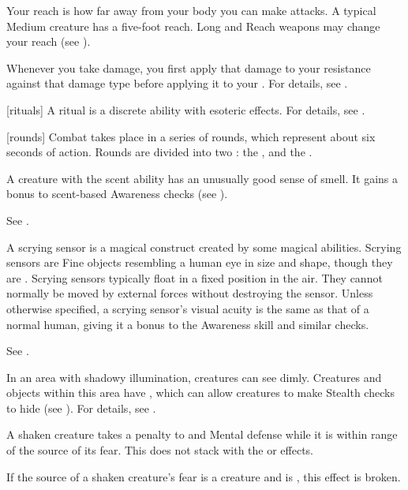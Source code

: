  Your reach is how far away from your body you can make  attacks.
A typical Medium creature has a five-foot reach.
Long and Reach weapons may change your reach (see ).

 Whenever you take damage, you first apply that damage to your resistance against that damage type before applying it to your .
For details, see .

[rituals] A ritual is a discrete  ability with esoteric effects.
For details, see .

[rounds] Combat takes place in a series of rounds, which represent about six seconds of action.
Rounds are divided into two : the , and the .

 A creature with the scent ability has an unusually good sense of smell.
It gains a  bonus to scent-based Awareness checks (see ).

 See .

 A scrying sensor is a magical construct created by some magical abilities.
Scrying sensors are Fine objects resembling a human eye in size and shape, though they are .
Scrying sensors typically float in a fixed position in the air.
They cannot normally be moved by external forces without destroying the sensor.
Unless otherwise specified, a scrying sensor's visual acuity is the same as that of a normal human, giving it a  bonus to the Awareness skill and similar checks.

 See .

 In an area with shadowy illumination, creatures can see dimly.
Creatures and objects within this area have \concealment, which can allow creatures to make Stealth checks to hide (see ).
For details, see .

 A shaken creature takes a  penalty to  and Mental defense while it is within \rngclose range of the source of its fear.
This does not stack with the  or  effects.

If the source of a shaken creature's fear is a creature and is , this effect is broken.

